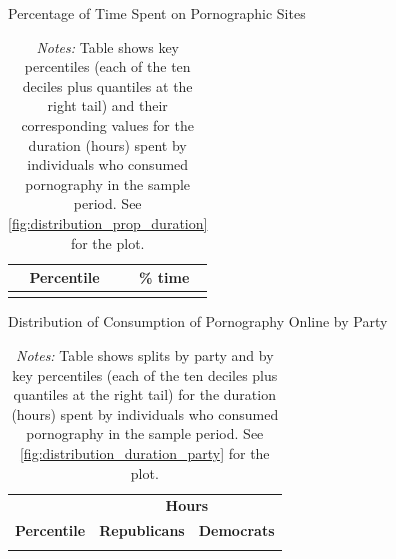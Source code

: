 \documentclass[12pt, letterpaper]{article}
\begin{document}
\begin{table}[ht] \centering \small \setlength\tabcolsep{10 pt}
	\caption{Percentage of Time Spent on Pornographic Sites}
	\label{tab:distribution_prop_duration}
	\begin{adjustbox}{max width=\textwidth}
		\begin{tabular}{cr}
			\toprule
			\multicolumn{1}{c}{\textbf{Percentile}}&\multicolumn{1}{c}{\textbf{\% time}}\\
			\midrule
			\\
			\bottomrule
		\end{tabular}
	\end{adjustbox}
	\caption*{\footnotesize \emph{Notes:} 
		Table shows key percentiles (each of the ten deciles plus quantiles at the right tail) and their corresponding values for the duration (hours) spent by individuals who consumed pornography in the sample period. 
		See \cref{fig:distribution_prop_duration} for the plot.
	}
\end{table}

\begin{table}[ht] \centering \small \setlength\tabcolsep{10 pt}
	\caption{Distribution of Consumption of Pornography Online by Party}
	\label{tab:distribution_duration_party}
	\begin{adjustbox}{max width=\textwidth}
		\begin{tabular}{crr}
			\toprule
			\multicolumn{1}{l}{\textbf{}}&\multicolumn{2}{c}{\textbf{Hours}}\\
			\cmidrule(l){2-3}
			\multicolumn{1}{l}{\textbf{Percentile}}&\multicolumn{1}{c}{\textbf{Republicans}}&\multicolumn{1}{c}{\textbf{Democrats}}\\
			\midrule
			\\
			\bottomrule
		\end{tabular}
	\end{adjustbox}
	\caption*{\footnotesize \emph{Notes:} 
		Table shows splits by party and by key percentiles (each of the ten deciles plus quantiles at the right tail) for the duration (hours) spent by individuals who consumed pornography in the sample period. See \cref{fig:distribution_duration_party} for the plot.
	}
\end{table}
\end{document}
